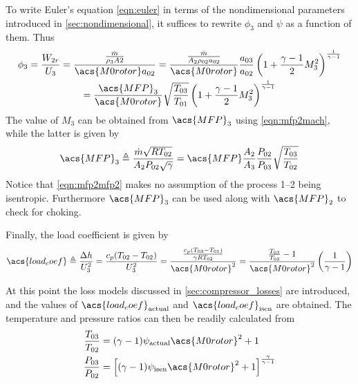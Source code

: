 \documentclass[tcc]{subfiles}
\begin{document}
To write Euler's equation \cref{eqn:euler} in terms of the nondimensional parameters introduced in \cref{sec:nondimensional}, it suffices to rewrite $\phi_3$ and $\psi$ as a function of them. Thus
\begin{multline}
    \label{eqn:phi2_dimensionless}
    \phi_3 = \frac{W_{2r}}{U_3} 
           = \frac{\frac{\dot{m}}{\rho_3 A2}}{\acs{M0rotor} a_{02}}
           = \frac{\MFPalt{2}}{\acs{M0rotor}} \frac{a_{03}}{a_{02}} \stagdensratio{3} \\ 
           = \frac{\acs{MFP}_3}{\acs{M0rotor}} \sqrt{\frac{T_{03}}{T_{01}}} \stagdensratio{3}
\end{multline}
The value of $M_3$ can be obtained from $\acs{MFP}_3$ using \cref{eqn:mfp2mach}, while the latter is given by
\begin{equation}
    \label{eqn:mfp2mfp2}
    \acs{MFP}_3 \triangleq \MFP{2} = \acs{MFP} \frac{A_2}{A_3} \frac{P_{02}}{P_{03}} \sqrt{\frac{T_{03}}{T_{02}}}
\end{equation}
Notice that \cref{eqn:mfp2mfp2} makes no assumption of the process 1--2 being isentropic. Furthermore $\acs{MFP}_3$ can be used along with $\acs{MFP}_2$ to check for choking.

Finally, the load coefficient is given by
\begin{equation}
    \acs{load_coef}\triangleq \frac{\Delta h}{U_3^2}
                      = \frac{c_p(T_{02}-T_{02})}{U_3^2}
                      = \frac{\frac{c_p(T_{03}-T_{01})}{\gamma R T_{02}}}
                                    {\acs{M0rotor}^2}
                      = \frac{\frac{T_{03}}{T_{02}}-1}
                                  {\acs{M0rotor}^2}
                        \left(\frac{1}{\gamma-1}\right)
\end{equation}

At this point the loss models discussed in \cref{sec:compressor_losses} are introduced, 
and the values of $\acs{load_coef}_{\text{actual}}$ and $\acs{load_coef}_{\text{isen}}$ are obtained.
The temperature and pressure ratios can then be readily calculated from
\begin{align}
    \label{eqn:psi2Tratio}
    \frac{T_{03}}{T_{02}} &= (\gamma - 1)\psi_{\text{actual}} \acs{M0rotor}^2 + 1 \\
    \label{eqn:psi2Pratio}
    \frac{P_{03}}{P_{02}} &= \left[(\gamma - 1)\psi_{\text{isen}} \acs{M0rotor}^2 + 1\right]^\frac{\gamma}{\gamma-1}
\end{align}
\end{document}
